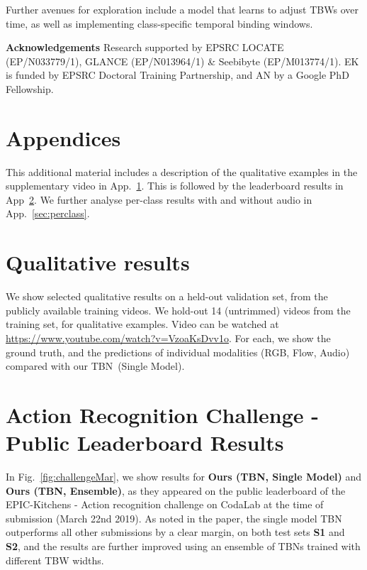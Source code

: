 \documentclass[10pt,twocolumn,letterpaper]{article}
\begin{document}
Further avenues for exploration include a model that learns to adjust TBWs over time, as well as implementing class-specific temporal binding windows. 

\vspace{2pt}
\noindent \textbf{Acknowledgements} \hspace{4pt} Research supported by EPSRC LOCATE (EP/N033779/1), GLANCE (EP/N013964/1) \& Seebibyte (EP/M013774/1). EK is funded by EPSRC Doctoral Training Partnership, and AN by a Google PhD Fellowship.  


{\small


}

\clearpage
\appendix
\section*{Appendices}

This additional material includes a description of the qualitative examples in the supplementary video in App.~\ref{sec:qual}. This is followed by the leaderboard results  in App~\ref{sec:leaderboard}. We further analyse per-class results with and without audio in App.~\ref{sec:perclass}.

\section{Qualitative results}
\label{sec:qual}

We show selected qualitative results on a held-out validation set, from the publicly available training videos.
We hold-out 14 (untrimmed) videos from the training set, for qualitative examples.  
Video can be watched at \url{https://www.youtube.com/watch?v=VzoaKsDvv1o}. For each, we show the ground truth, and the predictions of individual modalities (RGB, Flow, Audio) compared with our TBN~(Single Model). 


\section{Action Recognition Challenge - Public Leaderboard Results}
\label{sec:leaderboard}

In Fig.~\ref{fig:challengeMar}, we show results for \textbf{Ours (TBN, Single Model)} and \textbf{Ours (TBN, Ensemble)}, as they appeared on the public leaderboard of the EPIC-Kitchens - Action recognition challenge on CodaLab at the time of submission (March 22nd 2019).
As noted in the paper, the single model TBN outperforms all other submissions by a clear margin, on both test sets \textbf{S1} and \textbf{S2}, and the results are further improved using an ensemble of TBNs trained with different TBW widths. 
\end{document}
